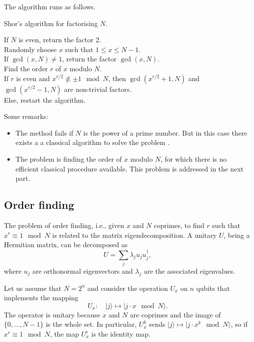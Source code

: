 \documentclass[a4paper, 10pt]{article}
\numberwithin{equation}{section}
\numberwithin{figure}{section}
\numberwithin{table}{section}
\begin{document}
The algorithm runs as follows.

\begin{algorithm}[h!]
	\caption{Shor's algorithm for factorising $N$.}
	If $N$ is even, return the factor 2.\\
	Randomly choose $x$ such that $1 \le x \le N-1$.\\
	If $\gcd(x,N)\neq1$, return the factor $\gcd(x,N)$.\\
	Find the order $r$ of $x$ modulo $N$.\\
	If $r$ is even and $x^{r/2}\not\equiv\pm 1\mod N$, then $\gcd(x^{r/2}+1,N)$ and $\gcd(x^{r/2}-1,N)$ are non-trivial factors.\\
	Else, restart the algorithm.
\end{algorithm}

Some remarks:

\begin{itemize}
	\item The method fails if $N$ is the power of a prime number. But in this case there exists a a classical algorithm to solve the problem \cite{portugal}. %
	\item The problem is finding the order of $x$ modulo $N$, for which there is no efficient classical procedure available. This problem is addressed in the next part.
\end{itemize}

\subsection{Order finding}

The problem of order finding, i.e., given $x$ and $N$ coprimes, to find $r$ such that $x^r \equiv 1 \mod N$ is related to the matrix eigendecomposition. A unitary $U$, being a Hermitian matrix, can be decomposed as
\begin{equation}
	U=\sum_j \lambda_ju_ju_j^\dagger,
\end{equation}
where $u_j$ are orthonormal eigenvectors and $\lambda_j$ are the associated eigenvalues.

Let us assume that $N=2^n$ and consider the operation $U_x$ on $n$ qubits that implements the mapping
\begin{equation}
	U_x : \quad |j\rangle \mapsto |j\cdot x\mod N\rangle.
\end{equation}
The operator is unitary because $x$ and $N$ are coprimes and the image of $\{0,...,N-1\}$ is the whole set. In particular, $U_x^k$ sends $|j\rangle \mapsto |j\cdot x^k \mod N\rangle$, so if $x^r \equiv 1 \mod N$, the map $U_x^r$ is the identity map.
\end{document}
